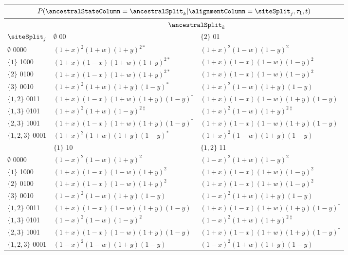 \begin{table}
\centering
\begin{tabular}{|l|ll|}
\multicolumn{3}{c}{$P(\ancestralStateColumn=\ancestralSplit_k|\alignmentColumn=\siteSplit_j,\tau_1,t)$}\\
\hline
& \multicolumn{2}{|c|}{$\ancestralSplit_k$}\\
    \hline
    $\siteSplit_j$    &$\emptyset$  00                              &$\{2\}$  01\\
    \hline
     $\emptyset$   0000&$(1+x)^2   (1+w)(1+y)^{2*}$          &$(1+x)^2   (1-w)(1-y)^2$\\
     $\{1\}$       1000&$(1+x)(1-x)(1+w)(1+y)^{2*}$          &$(1+x)(1-x)(1-w)(1-y)^2$\\
     $\{2\}$       0100&$(1+x)(1-x)(1+w)(1+y)^{2*}$          &$(1+x)(1-x)(1-w)(1-y)^2$\\
     $\{3\}$       0010&$(1+x)^2   (1+w)(1+y)(1-y)^*$        &$(1+x)^2   (1-w)(1+y)(1-y)$\\
     $\{1,2\}$     0011&$(1+x)(1-x)(1+w)(1+y)(1-y)^{\dagger}$&$(1+x)(1-x)(1-w)(1+y)(1-y)$\\
     $\{1,3\}$     0101&$(1+x)^2   (1+w)(1-y)^{2\ddagger}$   &$(1+x)^2   (1-w)(1+y)^{2\ddagger}$\\
     $\{2,3\}$     1001&$(1+x)(1-x)(1+w)(1+y)(1-y)^{\dagger}$&$(1+x)(1-x)(1-w)(1+y)(1-y)$\\
     $\{1,2,3\}$   0001&$(1+x)^2   (1+w)(1+y)(1-y)^*$        &$(1+x)^2   (1-w)(1+y)(1-y)$\\
    \hline
    \hline
    &$\{1\}$  10                           &$\{1,2\}$  11\\
    \hline
     $\emptyset$   0000&$(1-x)^2   (1-w)(1+y)^2$     &$(1-x)^2   (1+w)(1-y)^2$\\
     $\{1\}$       1000&$(1+x)(1-x)(1-w)(1+y)^2$     &$(1+x)(1-x)(1+w)(1-y)^2$\\
     $\{2\}$       0100&$(1+x)(1-x)(1-w)(1+y)^2$     &$(1+x)(1-x)(1+w)(1-y)^2$\\
     $\{3\}$       0010&$(1-x)^2   (1-w)(1+y)(1-y)$  &$(1-x)^2   (1+w)(1+y)(1-y)$\\
     $\{1,2\}$     0011&$(1+x)(1-x)(1-w)(1+y)(1-y)$  &$(1+x)(1-x)(1+w)(1+y)(1-y)^{\dagger}$\\
     $\{1,3\}$     0101&$(1-x)^2   (1-w)(1-y)^2$     &$(1-x)^2   (1+w)(1+y)^{2\ddagger}$\\
     $\{2,3\}$     1001&$(1+x)(1-x)(1-w)(1+y)(1-y)$  &$(1+x)(1-x)(1+w)(1+y)(1-y)^{\dagger}$\\
     $\{1,2,3\}$   0001&$(1-x)^2   (1-w)(1+y)(1-y)$  &$(1-x)^2   (1+w)(1+y)(1-y)$\\

\end{tabular}
\end{table}
